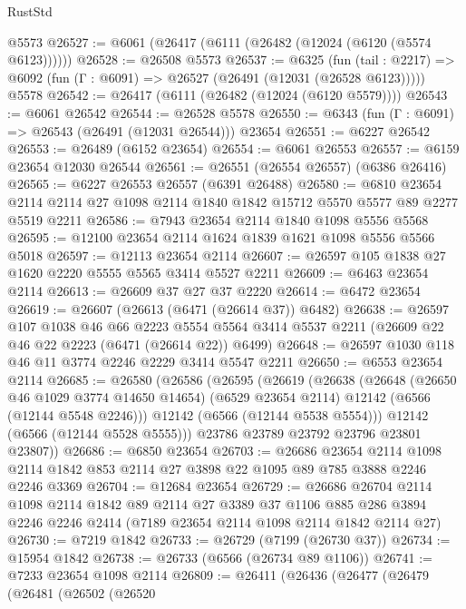 \begin{lexlean}{RustStd}
\begin{coremodule}
    @5573
@26527 := @6061 (@26417 (@6111 (@26482 (@12024 (@6120 (@5574 @6123))))))
@26528 := @26508 @5573
@26537 := @6325
    (fun (tail : @2217) => @6092 (fun (Γ : @6091) => @26527 (@26491 (@12031 (@26528 @6123)))))
    @5578
@26542 := @26417 (@6111 (@26482 (@12024 (@6120 @5579))))
@26543 := @6061 @26542
@26544 := @26528 @5578
@26550 := @6343 (fun (Γ : @6091) => @26543 (@26491 (@12031 @26544))) @23654
@26551 := @6227 @26542
@26553 := @26489 (@6152 @23654)
@26554 := @6061 @26553
@26557 := @6159 @23654 @12030 @26544
@26561 := @26551 (@26554 @26557) (@6386 @26416)
@26565 := @6227 @26553 @26557 (@6391 @26488)
@26580 := @6810
    @23654
    @2114
    @2114
    @27
    @1098
    @2114
    @1840
    @1842
    @15712
    @5570
    @5577
    @89
    @2277
    @5519
    @2211
@26586 := @7943 @23654 @2114 @1840 @1098 @5556 @5568
@26595 := @12100 @23654 @2114 @1624 @1839 @1621 @1098 @5556 @5566 @5018
@26597 := @12113 @23654 @2114
@26607 := @26597 @105 @1838 @27 @1620 @2220 @5555 @5565 @3414 @5527 @2211
@26609 := @6463 @23654 @2114
@26613 := @26609 @37 @27 @37 @2220
@26614 := @6472 @23654
@26619 := @26607 (@26613 (@6471 (@26614 @37)) @6482)
@26638 := @26597
    @107
    @1038
    @46
    @66
    @2223
    @5554
    @5564
    @3414
    @5537
    @2211
    (@26609 @22 @46 @22 @2223 (@6471 (@26614 @22)) @6499)
@26648 := @26597 @1030 @118 @46 @11 @3774 @2246 @2229 @3414 @5547 @2211
@26650 := @6553 @23654 @2114
@26685 := @26580
    (@26586
      (@26595
        (@26619
          (@26638
            (@26648
              (@26650 @46 @1029 @3774 @14650 @14654)
              (@6529 @23654 @2114)
              @12142
              (@6566 (@12144 @5548 @2246)))
            @12142
            (@6566 (@12144 @5538 @5554)))
          @12142
          (@6566 (@12144 @5528 @5555)))
        @23786
        @23789
        @23792
        @23796
        @23801
        @23807))
@26686 := @6850 @23654
@26703 := @26686
    @23654
    @2114
    @1098
    @2114
    @1842
    @853
    @2114
    @27
    @3898
    @22
    @1095
    @89
    @785
    @3888
    @2246
    @2246
    @3369
@26704 := @12684 @23654
@26729 := @26686
    @26704
    @2114
    @1098
    @2114
    @1842
    @89
    @2114
    @27
    @3389
    @37
    @1106
    @885
    @286
    @3894
    @2246
    @2246
    @2414
    (@7189 @23654 @2114 @1098 @2114 @1842 @2114 @27)
@26730 := @7219 @1842
@26733 := @26729 (@7199 (@26730 @37))
@26734 := @15954 @1842
@26738 := @26733 (@6566 (@26734 @89 @1106))
@26741 := @7233 @23654 @1098 @2114
@26809 := @26411
    (@26436
      (@26477
        (@26479
          (@26481
            (@26502
              (@26520

\end{coremodule}
\end{lexlean}
